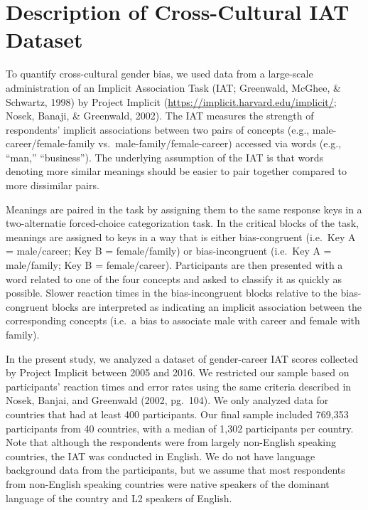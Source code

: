 \documentclass[man,floatsintext]{apa6}
\theoremstyle{definition}
\theoremstyle{definition}
\theoremstyle{definition}
\theoremstyle{remark}
\begin{document}
\section{Description of Cross-Cultural IAT
Dataset}\label{description-of-cross-cultural-iat-dataset}

To quantify cross-cultural gender bias, we used data from a large-scale
administration of an Implicit Association Task (IAT; Greenwald, McGhee,
\& Schwartz, 1998) by Project Implicit
(\url{https://implicit.harvard.edu/implicit/}; Nosek, Banaji, \&
Greenwald, 2002). The IAT measures the strength of respondents' implicit
associations between two pairs of concepts (e.g.,
male-career/female-family vs.~male-family/female-career) accessed via
words (e.g., \enquote{man,} \enquote{business}). The underlying
assumption of the IAT is that words denoting more similar meanings
should be easier to pair together compared to more dissimilar pairs.

Meanings are paired in the task by assigning them to the same response
keys in a two-alternatie forced-choice categorization task. In the
critical blocks of the task, meanings are assigned to keys in a way that
is either bias-congruent (i.e.~Key A = male/career; Key B =
female/family) or bias-incongruent (i.e.~Key A = male/family; Key B =
female/career). Participants are then presented with a word related to
one of the four concepts and asked to classify it as quickly as
possible. Slower reaction times in the bias-incongruent blocks relative
to the bias-congruent blocks are interpreted as indicating an implicit
association between the corresponding concepts (i.e.~a bias to associate
male with career and female with family).

In the present study, we analyzed a dataset of gender-career IAT scores
collected by Project Implicit between 2005 and 2016. We restricted our
sample based on participants' reaction times and error rates using the
same criteria described in Nosek, Banjai, and Greenwald (2002, pg.~104).
We only analyzed data for countries that had at least 400 participants.
Our final sample included 769,353 participants from 40 countries, with a
median of 1,302 participants per country. Note that although the
respondents were from largely non-English speaking countries, the IAT
was conducted in English. We do not have language background data from
the participants, but we assume that most respondents from non-English
speaking countries were native speakers of the dominant language of the
country and L2 speakers of English.
\end{document}
